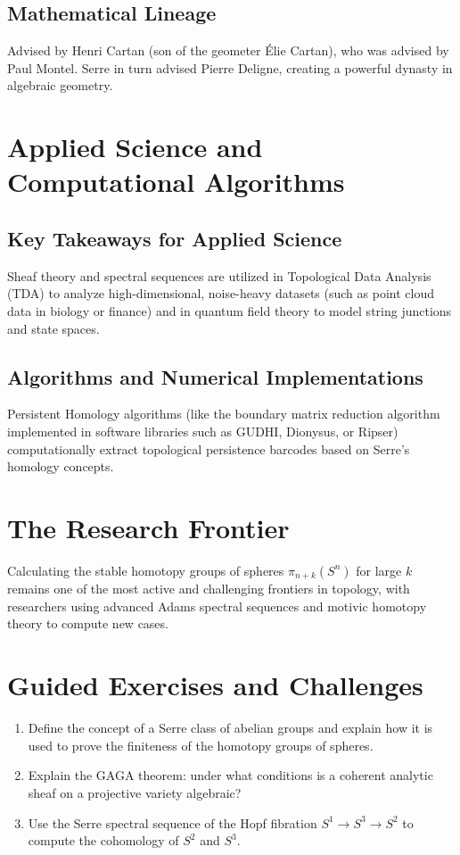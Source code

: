 \subsection{Mathematical Lineage}
Advised by Henri Cartan (son of the geometer \'Elie Cartan), who was advised by Paul Montel. Serre in turn advised Pierre Deligne, creating a powerful dynasty in algebraic geometry.

\section{Applied Science and Computational Algorithms}
\subsection{Key Takeaways for Applied Science}
Sheaf theory and spectral sequences are utilized in Topological Data Analysis (TDA) to analyze high-dimensional, noise-heavy datasets (such as point cloud data in biology or finance) and in quantum field theory to model string junctions and state spaces.

\subsection{Algorithms and Numerical Implementations}
Persistent Homology algorithms (like the boundary matrix reduction algorithm implemented in software libraries such as GUDHI, Dionysus, or Ripser) computationally extract topological persistence barcodes based on Serre's homology concepts.

\section{The Research Frontier}
Calculating the stable homotopy groups of spheres $\pi_{n+k}(S^n)$ for large $k$ remains one of the most active and challenging frontiers in topology, with researchers using advanced Adams spectral sequences and motivic homotopy theory to compute new cases.

\section{Guided Exercises and Challenges}
\begin{enumerate}[label=\textbf{\arabic*.}]
  \item Define the concept of a Serre class of abelian groups and explain how it is used to prove the finiteness of the homotopy groups of spheres.
  \item Explain the GAGA theorem: under what conditions is a coherent analytic sheaf on a projective variety algebraic?
  \item Use the Serre spectral sequence of the Hopf fibration $S^1 \to S^3 \to S^2$ to compute the cohomology of $S^2$ and $S^3$.
\end{enumerate}

